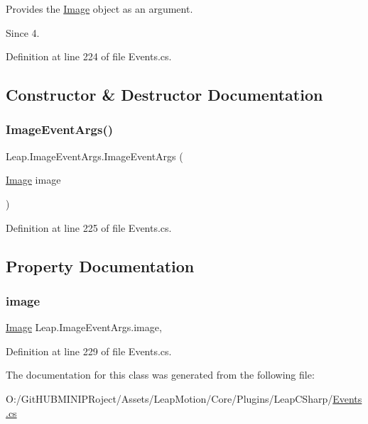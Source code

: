 Provides the \mbox{\hyperlink{class_leap_1_1_image}{Image}} object as an argument. \begin{DoxySince}{Since}
4. 
\end{DoxySince}


Definition at line 224 of file Events.\+cs.



\subsection{Constructor \& Destructor Documentation}
\mbox{\label{class_leap_1_1_image_event_args_ad95b821e3de6b9b173b8e1f16521109b}} 
\subsubsection{\texorpdfstring{ImageEventArgs()}{ImageEventArgs()}}
{\footnotesize\ttfamily Leap.\+Image\+Event\+Args.\+Image\+Event\+Args (\begin{DoxyParamCaption}\item[{\mbox{\hyperlink{class_leap_1_1_image}{Image}}}]{image }\end{DoxyParamCaption})}



Definition at line 225 of file Events.\+cs.



\subsection{Property Documentation}
\mbox{\label{class_leap_1_1_image_event_args_af6b4bda166dccb8868956722e975ae2f}} 
\subsubsection{\texorpdfstring{image}{image}}
{\footnotesize\ttfamily \mbox{\hyperlink{class_leap_1_1_image}{Image}} Leap.\+Image\+Event\+Args.\+image\hspace{0.3cm}{\ttfamily [get]}, {\ttfamily [set]}}



Definition at line 229 of file Events.\+cs.



The documentation for this class was generated from the following file\+:\begin{DoxyCompactItemize}
\item 
O\+:/\+Git\+H\+U\+B\+M\+I\+N\+I\+P\+Roject/\+Assets/\+Leap\+Motion/\+Core/\+Plugins/\+Leap\+C\+Sharp/\mbox{\hyperlink{_events_8cs}{Events.\+cs}}\end{DoxyCompactItemize}
